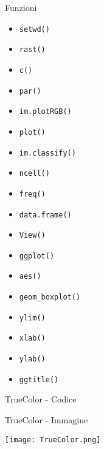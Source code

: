 \documentclass{beamer} %
\begin{document}
            \begin{frame}{Funzioni}
                \begin{multicols}{2}
                    \begin{itemize}
                        \item    \texttt{setwd()} 
                        \item    \texttt{rast()} 
                        \item    \texttt{c()}
                        \item    \texttt{par()} 
                        \item    \texttt{im.plotRGB()}
                        \item    \texttt{plot()}
                        \item    \texttt{im.classify()}
                        \item    \texttt{ncell()}
                        \item    \texttt{freq()}
                \columnbreak
                        \item    \texttt{data.frame()}
                        \item    \texttt{View()}
                        \item    \texttt{ggplot()}
                        \item    \texttt{aes()}
                        \item    \texttt{geom_boxplot()}
                        \item    \texttt{ylim()}
                        \item    \texttt{xlab()}
                        \item    \texttt{ylab()}
                        \item    \texttt{ggtitle()}
                    \end{itemize}
                \end{multicols}
        \end{frame}
        
        \begin{frame}{TrueColor - Codice}
            
        \end{frame}

        \begin{frame}{TrueColor - Immagine}
            \begin{center}
                \texttt{[image: TrueColor.png]}
            \end{center}
        \end{frame}
\end{document}
